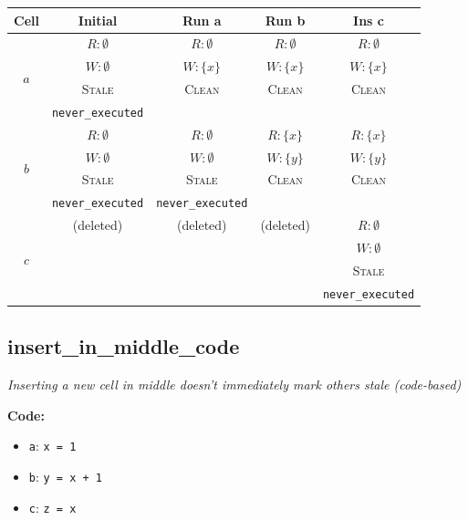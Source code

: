\documentclass{article}
\begin{document}
\begin{center}
\small
\begin{tabular}{|c|c|c|c|c|}
\hline
\textbf{Cell} & \textbf{Initial} & \textbf{Run a} & \textbf{Run b} & \textbf{Ins c} \\
\hline
\multirow{4}{*}{$a$}
  & $R: \emptyset$ & $R: \emptyset$ & $R: \emptyset$ & $R: \emptyset$ \\
  & $W: \emptyset$ & $W: \{x\}$ & $W: \{x\}$ & $W: \{x\}$ \\
  & \textsc{Stale} & \textsc{Clean} & \textsc{Clean} & \textsc{Clean} \\
  & \footnotesize\texttt{never\_executed} &  &  &  \\
\hline
\multirow{4}{*}{$b$}
  & $R: \emptyset$ & $R: \emptyset$ & $R: \{x\}$ & $R: \{x\}$ \\
  & $W: \emptyset$ & $W: \emptyset$ & $W: \{y\}$ & $W: \{y\}$ \\
  & \textsc{Stale} & \textsc{Stale} & \textsc{Clean} & \textsc{Clean} \\
  & \footnotesize\texttt{never\_executed} & \footnotesize\texttt{never\_executed} &  &  \\
\hline
\multirow{4}{*}{$c$}
  & (deleted) & (deleted) & (deleted) & $R: \emptyset$ \\
  &  &  &  & $W: \emptyset$ \\
  &  &  &  & \textsc{Stale} \\
  &  &  &  & \footnotesize\texttt{never\_executed} \\
\hline
\end{tabular}
\end{center}


\subsection{insert\_in\_middle\_code}
\textit{Inserting a new cell in middle doesn't immediately mark others stale (code-based)}

\textbf{Code:}
\begin{itemize}
  \item \texttt{a}: \verb|x = 1|
  \item \texttt{b}: \verb|y = x + 1|
  \item \texttt{c}: \verb|z = x|
\end{itemize}
\end{document}
